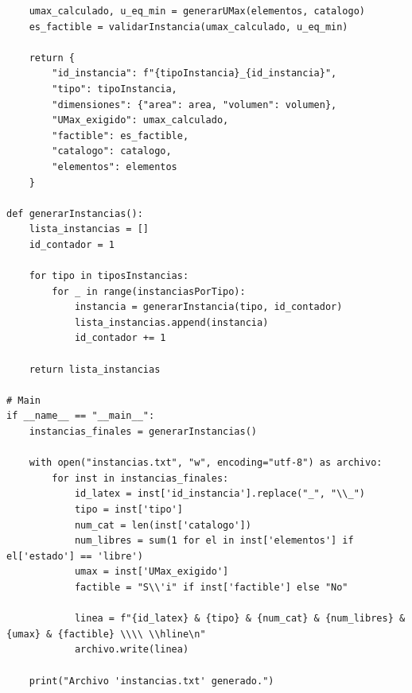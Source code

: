 \begin{lstlisting}
    umax_calculado, u_eq_min = generarUMax(elementos, catalogo)
    es_factible = validarInstancia(umax_calculado, u_eq_min)
    
    return {
        "id_instancia": f"{tipoInstancia}_{id_instancia}",
        "tipo": tipoInstancia,
        "dimensiones": {"area": area, "volumen": volumen},
        "UMax_exigido": umax_calculado,
        "factible": es_factible,
        "catalogo": catalogo,
        "elementos": elementos
    }

def generarInstancias():
    lista_instancias = []
    id_contador = 1
    
    for tipo in tiposInstancias:
        for _ in range(instanciasPorTipo):
            instancia = generarInstancia(tipo, id_contador)
            lista_instancias.append(instancia)
            id_contador += 1
            
    return lista_instancias

# Main
if __name__ == "__main__":
    instancias_finales = generarInstancias()
    
    with open("instancias.txt", "w", encoding="utf-8") as archivo:
        for inst in instancias_finales:
            id_latex = inst['id_instancia'].replace("_", "\\_")
            tipo = inst['tipo']
            num_cat = len(inst['catalogo'])
            num_libres = sum(1 for el in inst['elementos'] if el['estado'] == 'libre')
            umax = inst['UMax_exigido']
            factible = "S\\'i" if inst['factible'] else "No"
            
            linea = f"{id_latex} & {tipo} & {num_cat} & {num_libres} & {umax} & {factible} \\\\ \\hline\n"
            archivo.write(linea)
            
    print("Archivo 'instancias.txt' generado.")
\end{lstlisting}
